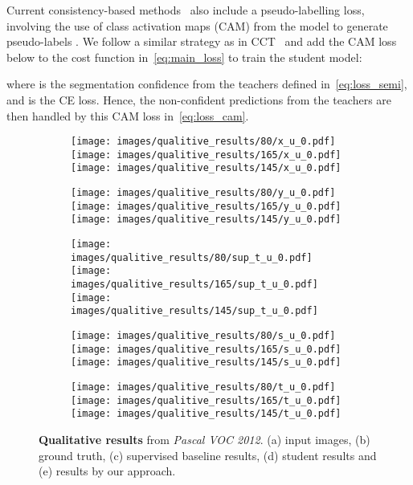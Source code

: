 \documentclass[10pt,twocolumn,letterpaper]{article}
\begin{document}
Current consistency-based methods~\cite{ouali2020semi,huang2018weakly,lee2019ficklenet,lai2021semi} also include a pseudo-labelling loss, involving the use of class activation maps (CAM) from the model to generate pseudo-labels . We follow a similar strategy as in CCT~\cite{ouali2020semi} and add the CAM loss below to the cost function in~\eqref{eq:main_loss} to 
train the student model:

where  is the segmentation confidence from the teachers defined in~\eqref{eq:loss_semi}, and  is the CE loss. 
Hence, the non-confident predictions from the teachers are then handled by this CAM loss in~\eqref{eq:loss_cam}.


\begin{figure}
    \centering
     \begin{subfigure}[b]{0.19\linewidth}
        \texttt{[image:  images/qualitive\_results/80/x\_u\_0.pdf]}
        \texttt{[image:  images/qualitive\_results/165/x\_u\_0.pdf]}
\texttt{[image:  images/qualitive\_results/145/x\_u\_0.pdf]}
        \caption{}
     \end{subfigure}
    \begin{subfigure}[b]{0.19\linewidth}
        \texttt{[image:  images/qualitive\_results/80/y\_u\_0.pdf]}
        \texttt{[image:  images/qualitive\_results/165/y\_u\_0.pdf]}
\texttt{[image:  images/qualitive\_results/145/y\_u\_0.pdf]}
        \caption{}
    \end{subfigure}
     \begin{subfigure}[b]{0.19\linewidth}
        \texttt{[image:  images/qualitive\_results/80/sup\_t\_u\_0.pdf]}
        \texttt{[image:  images/qualitive\_results/165/sup\_t\_u\_0.pdf]}
\texttt{[image:  images/qualitive\_results/145/sup\_t\_u\_0.pdf]}
    \caption{}
    \end{subfigure}
     \begin{subfigure}[b]{0.19\linewidth}
        \texttt{[image:  images/qualitive\_results/80/s\_u\_0.pdf]}
        \texttt{[image:  images/qualitive\_results/165/s\_u\_0.pdf]}
\texttt{[image:  images/qualitive\_results/145/s\_u\_0.pdf]}
    \caption{}
    \end{subfigure}
    \begin{subfigure}[b]{0.19\linewidth}
        \texttt{[image:  images/qualitive\_results/80/t\_u\_0.pdf]}
        \texttt{[image:  images/qualitive\_results/165/t\_u\_0.pdf]}
\texttt{[image:  images/qualitive\_results/145/t\_u\_0.pdf]}
    \caption{}
    \end{subfigure}
    \caption{\textbf{Qualitative results} from \textit{Pascal VOC 2012}. (a) input images, (b) ground truth, (c) supervised baseline results, (d) student results and (e) results by our approach. 
    } \vspace{-10pt}
    \label{fig:quality_results}
\end{figure}
\end{document}
